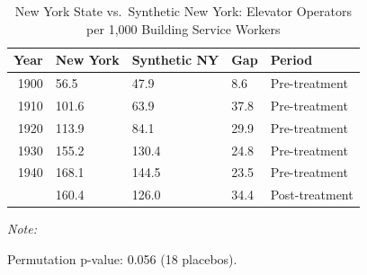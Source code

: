 \begin{table}[!h]
\centering
\caption{New York State vs.~Synthetic New York: Elevator Operators per 1,000 Building Service Workers}
\centering
\begin{threeparttable}
\begin{tabular}[t]{rllll}
\toprule
Year & New York & Synthetic NY & Gap & Period\\
\midrule
1900 & 56.5 & 47.9 & 8.6 & Pre-treatment\\
1910 & 101.6 & 63.9 & 37.8 & Pre-treatment\\
1920 & 113.9 & 84.1 & 29.9 & Pre-treatment\\
1930 & 155.2 & 130.4 & 24.8 & Pre-treatment\\
1940 & 168.1 & 144.5 & 23.5 & Pre-treatment\\
\addlinespace
1950 & 160.4 & 126.0 & 34.4 & Post-treatment\\
\bottomrule
\end{tabular}
\begin{tablenotes}
\item \textit{Note: } 
\item Permutation p-value: 0.056 (18 placebos).
\end{tablenotes}
\end{threeparttable}
\end{table}
